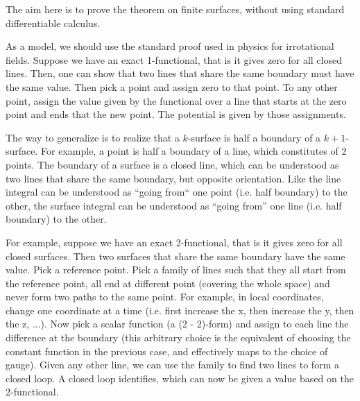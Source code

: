 \begin{remark}
	The aim here is to prove the theorem on finite surfaces, without using standard differentiable calculus.
	
	As a model, we should use the standard proof used in physics for irrotational fields. Suppose we have an exact 1-functional, that is it gives zero for all closed lines. Then, one can show that two lines that share the same boundary must have the same value. Then pick a point and assign zero to that point. To any other point, assign the value given by the functional over a line that starts at the zero point and ends that the new point. The potential is given by those assignments.
	
	The way to generalize is to realize that a $k$-surface is half a boundary of a $k+1$-surface. For example, a point is half a boundary of a line, which constitutes of 2 points. The boundary of a surface is a closed line, which can be understood as two lines that share the same boundary, but opposite orientation. Like the line integral can be understood as ``going from`` one point (i.e. half boundary) to the other, the surface integral can be understood as ``going from'' one line (i.e. half boundary) to the other.
	
	For example, suppose we have an exact 2-functional, that is it gives zero for all closed surfaces. Then two surfaces that share the same boundary have the same value. Pick a reference point. Pick a family of lines such that they all start from the reference point, all end at different point (covering the whole space) and never form two paths to the same point. For example, in local coordinates, change one coordinate at a time (i.e. first increase the x, then increase the y, then the z, ...). Now pick a scalar function (a (2 - 2)-form) and assign to each line the difference at the boundary (this arbitrary choice is the equivalent of choosing the constant function in the previous case, and effectively maps to the choice of gauge). Given any other line, we can use the family to find two lines to form a closed loop. A closed loop identifies, which can now be given a value based on the 2-functional.
	

\end{remark}
